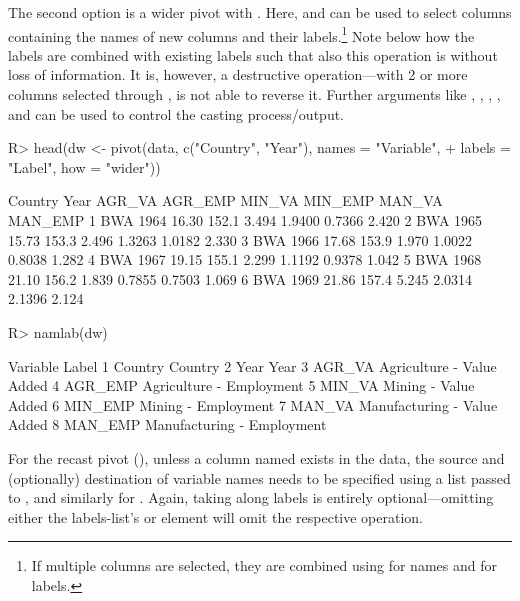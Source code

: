 \documentclass[nojss]{jss} %
\newcommand{\fct}[1]{\code{#1()}}
\begin{document}
The second option is a wider pivot with . Here,  and  can be used to select columns containing the names of new columns and their labels.\footnote{If multiple columns are selected, they are combined using  for names and  for labels.} Note below how the labels are combined with existing labels such that also this operation is without loss of information. It is, however, a destructive operation---with 2 or more columns selected through , \fct{pivot} is not able to reverse it. Further arguments like , , , , and  can be used to control the casting process/output.
%
\begin{Schunk}
\begin{Sinput}
R> head(dw <- pivot(data, c("Country", "Year"), names = "Variable",
+                   labels = "Label", how = "wider"))
\end{Sinput}
\begin{Soutput}
  Country Year AGR_VA AGR_EMP MIN_VA MIN_EMP MAN_VA MAN_EMP
1     BWA 1964  16.30   152.1  3.494  1.9400 0.7366   2.420
2     BWA 1965  15.73   153.3  2.496  1.3263 1.0182   2.330
3     BWA 1966  17.68   153.9  1.970  1.0022 0.8038   1.282
4     BWA 1967  19.15   155.1  2.299  1.1192 0.9378   1.042
5     BWA 1968  21.10   156.2  1.839  0.7855 0.7503   1.069
6     BWA 1969  21.86   157.4  5.245  2.0314 2.1396   2.124
\end{Soutput}
\begin{Sinput}
R> namlab(dw)
\end{Sinput}
\begin{Soutput}
  Variable                       Label
1  Country                     Country
2     Year                        Year
3   AGR_VA   Agriculture - Value Added
4  AGR_EMP    Agriculture - Employment
5   MIN_VA        Mining - Value Added
6  MIN_EMP         Mining - Employment
7   MAN_VA Manufacturing - Value Added
8  MAN_EMP  Manufacturing - Employment
\end{Soutput}
\end{Schunk}
%
For the recast pivot (), unless a column named  exists in the data, the source and (optionally) destination of variable names needs to be specified using a list passed to , and similarly for . Again, taking along labels is entirely optional---omitting either the labels-list's  or  element will omit the respective operation.
%
\end{document}
